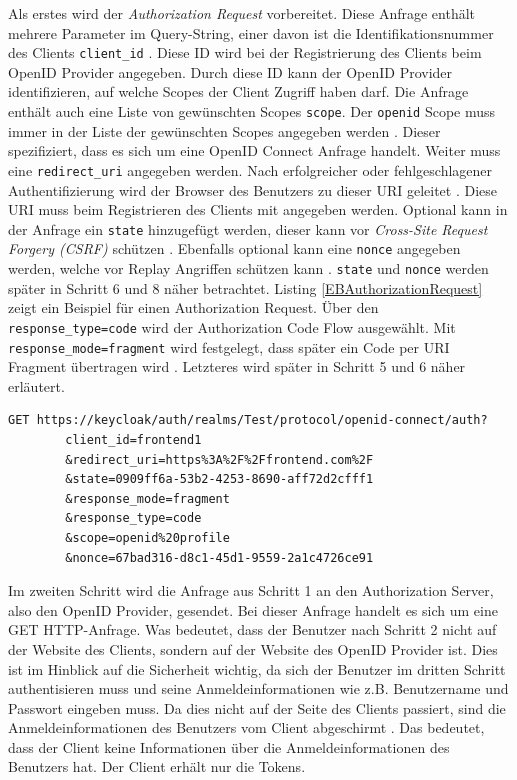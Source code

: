 Als erstes wird der \textit{Authorization Request} vorbereitet. Diese Anfrage enthält mehrere Parameter im Query-String, einer davon ist die Identifikationsnummer des Clients \texttt{client\_id} \cite[Authentication Request]{EB4}. Diese ID wird bei der Registrierung des Clients beim OpenID Provider angegeben. Durch diese ID kann der OpenID Provider identifizieren, auf welche Scopes  der Client Zugriff haben darf. Die Anfrage enthält auch eine Liste von gewünschten Scopes \texttt{scope}. Der \texttt{openid} Scope muss immer in der Liste der gewünschten Scopes angegeben werden \cite[Authentication Request]{EB4}. Dieser spezifiziert, dass es sich um eine OpenID Connect Anfrage handelt. Weiter muss eine \texttt{redirect\_uri} angegeben werden. Nach erfolgreicher oder fehlgeschlagener Authentifizierung wird der Browser des Benutzers zu dieser URI geleitet \cite[Authentication Request]{EB4}. Diese URI muss beim Registrieren des Clients mit angegeben werden. Optional kann in der Anfrage ein \texttt{state} hinzugefügt werden, dieser kann vor \textit{Cross-Site Request Forgery (CSRF)} schützen \cite[Authentication Request]{EB4}. Ebenfalls optional kann eine \texttt{nonce} angegeben werden, welche vor Replay Angriffen schützen kann \cite[Authentication Request]{EB4}. \texttt{state} und \texttt{nonce} werden später in Schritt 6 und 8 näher betrachtet. Listing \ref{EBAuthorizationRequest} zeigt ein Beispiel für einen Authorization Request. Über den \texttt{response\_type=code} wird der Authorization Code Flow ausgewählt. Mit \texttt{response\_mode=fragment} wird festgelegt, dass später ein Code per URI Fragment übertragen wird \cite[JavaScript Adapter Reference]{EB26}. Letzteres wird später in Schritt 5 und 6 näher erläutert.

\begin{lstlisting}[caption=Beispiel Authorization Request, captionpos=b, label=EBAuthorizationRequest]
GET https://keycloak/auth/realms/Test/protocol/openid-connect/auth?
        client_id=frontend1
        &redirect_uri=https%3A%2F%2Ffrontend.com%2F
        &state=0909ff6a-53b2-4253-8690-aff72d2cfff1
        &response_mode=fragment
        &response_type=code
        &scope=openid%20profile
        &nonce=67bad316-d8c1-45d1-9559-2a1c4726ce91
\end{lstlisting}

Im zweiten Schritt wird die Anfrage aus Schritt 1 an den Authorization Server, also den OpenID Provider, gesendet. Bei dieser Anfrage handelt es sich um eine GET HTTP-Anfrage. Was bedeutet, dass der Benutzer nach Schritt 2 nicht auf der Website des Clients, sondern auf der Website des OpenID Provider ist. Dies ist im Hinblick auf die Sicherheit wichtig, da sich der Benutzer im dritten Schritt authentisieren muss und seine Anmeldeinformationen wie z.B. Benutzername und Passwort eingeben muss. Da dies nicht auf der Seite des Clients passiert, sind die Anmeldeinformationen des Benutzers vom Client abgeschirmt \cite[How Does Security Work]{keycloakDocs}. Das bedeutet, dass der Client keine Informationen über die Anmeldeinformationen des Benutzers hat. Der Client erhält nur die Tokens.

